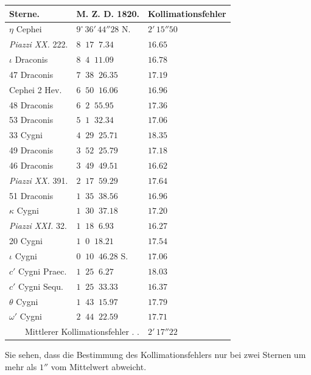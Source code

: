 \begin{center}
\begin{tabular}{l|l|l}
Sterne. & M. Z. D. 1820. & Kollimationsfehler \\
\hline
$\eta$ Cephei & $9^\circ\,36'\,44''28$ N. & $2'\,15''50$ \\
\emph{Piazzi XX.} 222. & $8\;\;17\;\;7.34$ & $16.65$ \\
$\iota$ Draconis & $8\;\;4\;\;11.09$ & $16.78$ \\
47 Draconis & $7\;\;38\;\;26.35$ & $17.19$ \\
Cephei 2 Hev. & $6\;\;50\;\;16.06$ & $16.96$ \\
48 Draconis & $6\;\;2\;\;55.95$ & $17.36$ \\
53 Draconis & $5\;\;1\;\;32.34$ & $17.06$ \\
33 Cygni & $4\;\;29\;\;25.71$ & $18.35$ \\
49 Draconis & $3\;\;52\;\;25.79$ & $17.18$ \\
46 Draconis & $3\;\;49\;\;49.51$ & $16.62$ \\
\emph{Piazzi XX.} 391. & $2\;\;17\;\;59.29$ & $17.64$ \\
51 Draconis & $1\;\;35\;\;38.56$ & $16.96$ \\
$\kappa$ Cygni & $1\;\;30\;\;37.18$ & $17.20$ \\
\emph{Piazzi XXI.} 32. & $1\;\;18\;\;6.93$ & $16.27$ \\
20 Cygni & $1\;\;0\;\;18.21$ & $17.54$ \\
$\iota$ Cygni & $0\;\;10\;\;46.28$ S. & $17.06$ \\
$c'$ Cygni Praec. & $1\;\;25\;\;6.27$ & $18.03$ \\
$c'$ Cygni Sequ. & $1\;\;25\;\;33.33$ & $16.37$ \\
$\theta$ Cygni & $1\;\;43\;\;15.97$ & $17.79$ \\
$\omega'$ Cygni & $2\;\;44\;\;22.59$ & $17.71$ \\
\multicolumn{2}{r|}{Mittlerer Kollimationsfehler . .} & $2'\,17''22$ \\
\end{tabular}
\end{center}

Sie sehen, dass die Bestimmung des Kollimationsfehlers nur bei zwei Sternen um mehr als $1''$ vom Mittelwert abweicht.
